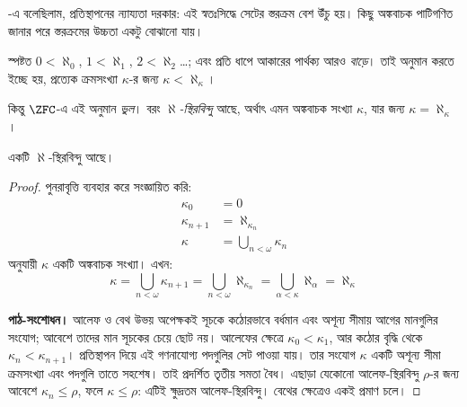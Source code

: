 \documentclass[../../../include/open-logic-section]{subfiles}
\begin{document}

-এ বলেছিলাম, প্রতিস্থাপনের
ন্যায্যতা দরকার: এই স্বতঃসিদ্ধে সেটের স্তরক্রম
বেশ উঁচু হয়। কিছু অঙ্কবাচক পাটিগণিত জানার পরে
স্তরক্রমের উচ্চতা একটু বোঝানো যায়।

স্পষ্টত $0<\aleph_0$, $1<\aleph_1$,
$2<\aleph_2$\ldots; এবং প্রতি ধাপে আকারের
পার্থক্য আরও \emph{বাড়ে}। তাই অনুমান করতে
ইচ্ছে হয়, প্রত্যেক ক্রমসংখ্যা $\kappa$-র জন্য
$\kappa<\aleph_\kappa$।

কিন্তু $\ZFC$-এ এই অনুমান \emph{ভুল}। বরং
\emph{$\aleph$-স্থিরবিন্দু} আছে, অর্থাৎ এমন
অঙ্কবাচক সংখ্যা $\kappa$, যার জন্য
$\kappa=\aleph_\kappa$।

\begin{prop}
একটি $\aleph$-স্থিরবিন্দু আছে।
\end{prop}

\begin{proof}
পুনরাবৃত্তি ব্যবহার করে সংজ্ঞায়িত করি:
\begin{align*}
	\kappa_0 &= 0\\
	\kappa_{n+1} &= \aleph_{\kappa_n}\\
	\kappa&= \bigcup_{n < \omega}\kappa_n
\end{align*}
অনুযায়ী $\kappa$ একটি অঙ্কবাচক সংখ্যা। এখন:
\[
	\kappa= \bigcup_{n < \omega} \kappa_{n+1} =
	\bigcup_{n < \omega}\aleph_{\kappa_n} =
	\bigcup_{\alpha < \kappa}\aleph_\alpha = \aleph_\kappa
\]
\par\noindent\textbf{পাঠ-সংশোধন।} আলেফ ও বেথ উভয় অপেক্ষকই সূচকে কঠোরভাবে বর্ধমান এবং
অশূন্য সীমায় আগের মানগুলির সংযোগ; আবেশে তাদের মান সূচকের
চেয়ে ছোট নয়। আলেফের ক্ষেত্রে $\kappa_0<\kappa_1$, আর
কঠোর বৃদ্ধি থেকে $\kappa_n<\kappa_{n+1}$। প্রতিস্থাপন
দিয়ে এই গণনাযোগ্য পদগুলির সেট পাওয়া যায়। তার সংযোগ
$\kappa$ একটি অশূন্য সীমা ক্রমসংখ্যা এবং পদগুলি তাতে সহশেষ।
তাই প্রদর্শিত তৃতীয় সমতা বৈধ। এছাড়া যেকোনো আলেফ-স্থিরবিন্দু
$\rho$-র জন্য আবেশে $\kappa_n\leq\rho$, ফলে $\kappa\leq\rho$:
এটিই ক্ষুদ্রতম আলেফ-স্থিরবিন্দু। বেথের ক্ষেত্রেও একই প্রমাণ চলে।
\end{proof}
\end{document}

